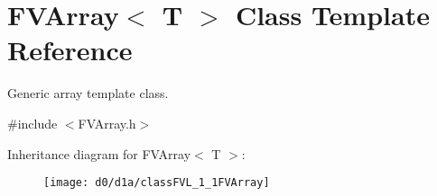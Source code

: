 \hypertarget{classFVL_1_1FVArray}{
\section{FVArray$<$ T $>$ Class Template Reference}
\label{d0/d1a/classFVL_1_1FVArray}
}


Generic array template class.  




{\ttfamily \#include $<$FVArray.h$>$}

Inheritance diagram for FVArray$<$ T $>$:\begin{figure}[H]
\begin{center}
\leavevmode
\texttt{[image: d0/d1a/classFVL\_1\_1FVArray]}
\end{center}
\end{figure}
